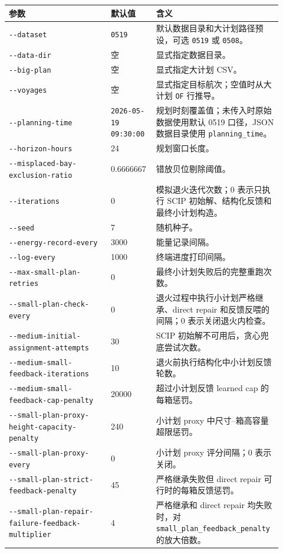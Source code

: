\documentclass[UTF8,a4paper,11pt]{ctexart}
\newcommand{\code}[1]{\nolinkurl{#1}}
\begin{document}
\begin{longtable}{L{0.36\linewidth}L{0.16\linewidth}L{0.40\linewidth}}
\toprule
参数 & 默认值 & 含义\\
\midrule
\code{--dataset} & \code{0519} & 默认数据目录和大计划路径预设，可选 \code{0519} 或 \code{0508}。\\
\code{--data-dir} & 空 & 显式指定数据目录。\\
\code{--big-plan} & 空 & 显式指定大计划 CSV。\\
\code{--voyages} & 空 & 显式指定目标航次；空值时从大计划 \code{OF} 行推导。\\
\code{--planning-time} & \code{2026-05-19 09:30:00} & 规划时刻覆盖值；未传入时原始数据使用默认 0519 口径，JSON 数据目录使用 \code{planning_time}。\\
\code{--horizon-hours} & 24 & 规划窗口长度。\\
\code{--misplaced-bay-exclusion-ratio} & 0.6666667 & 错放贝位剔除阈值。\\
\code{--iterations} & 0 & 模拟退火迭代次数；0 表示只执行 SCIP 初始解、结构化反馈和最终小计划构造。\\
\code{--seed} & 7 & 随机种子。\\
\code{--energy-record-every} & 3000 & 能量记录间隔。\\
\code{--log-every} & 1000 & 终端进度打印间隔。\\
\code{--max-small-plan-retries} & 0 & 最终小计划失败后的完整重跑次数。\\
\code{--small-plan-check-every} & 0 & 退火过程中执行小计划严格继承、direct repair 和反馈反喂的间隔；0 表示关闭退火内检查。\\
\code{--medium-initial-assignment-attempts} & 30 & SCIP 初始解不可用后，贪心兜底尝试次数。\\
\code{--medium-small-feedback-iterations} & 10 & 退火前执行结构化中小计划反馈轮数。\\
\code{--medium-small-feedback-cap-penalty} & 20000 & 超过小计划反馈 learned cap 的每箱惩罚。\\
\code{--small-plan-proxy-height-capacity-penalty} & 240 & 小计划 proxy 中尺寸--箱高容量超限惩罚。\\
\code{--small-plan-proxy-every} & 0 & 小计划 proxy 评分间隔；0 表示关闭。\\
\code{--small-plan-strict-feedback-penalty} & 45 & 严格继承失败但 direct repair 可行时的每箱反馈惩罚。\\
\code{--small-plan-repair-failure-feedback-multiplier} & 4 & 严格继承和 direct repair 均失败时，对 \code{small_plan_feedback_penalty} 的放大倍数。\\

\end{longtable}
\end{document}
